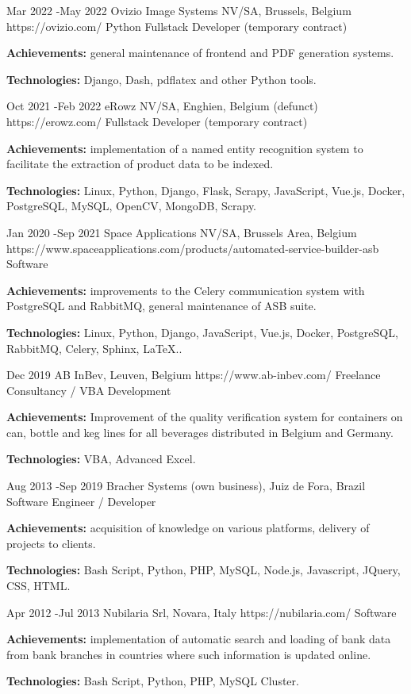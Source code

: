 \documentclass[10pt]{article} %
\begin{document}
\job
{Mar 2022 -}{May 2022}
{Ovizio Image Systems NV/SA, Brussels, Belgium}
{https://ovizio.com/}
{Python Fullstack Developer (temporary contract)}
{\rule{0mm}{2mm}\textbf{Achievements:} general maintenance of frontend and PDF generation systems.\\
\rule{0mm}{3mm}\textbf{Technologies:} Django, Dash, pdflatex and other Python tools.}

\job
{Oct 2021 -}{Feb 2022}
{eRowz  NV/SA, Enghien, Belgium (defunct)}
{https://erowz.com/}
{Fullstack Developer (temporary contract)}
{\rule{0mm}{2mm}\textbf{Achievements:} implementation of a named entity recognition system to facilitate the extraction of product data to be indexed.\\
\rule{0mm}{3mm}\textbf{Technologies:} Linux, Python, Django, Flask, Scrapy, JavaScript, Vue.js, Docker, PostgreSQL, MySQL, OpenCV, MongoDB, Scrapy.}

\job
{Jan 2020 -}{Sep 2021}
{Space Applications NV/SA, Brussels Area, Belgium}
{https://www.spaceapplications.com/products/automated-service-builder-asb}
{Software }
{\rule{0mm}{2mm}\textbf{Achievements:} improvements to the Celery communication system with PostgreSQL and RabbitMQ, general maintenance of ASB suite.\\
\rule{0mm}{3mm}\textbf{Technologies:} Linux, Python, Django, JavaScript, Vue.js, Docker, PostgreSQL, RabbitMQ, Celery, Sphinx, LaTeX..}

\job
{Dec 2019}{}
{AB InBev, Leuven, Belgium}
{https://www.ab-inbev.com/}
{Freelance Consultancy / VBA Development}
{\rule{0mm}{2mm}\textbf{Achievements:} Improvement of the quality verification system for containers on can, bottle and keg lines for all beverages distributed in Belgium and Germany.\\
\rule{0mm}{3mm}\textbf{Technologies:} VBA, Advanced Excel.}

\job
{Aug 2013 -}{Sep 2019}
{Bracher Systems (own business), Juiz de Fora, Brazil}
{}
{Software Engineer / Developer}
{\rule{0mm}{2mm}\textbf{Achievements:} acquisition of knowledge on various platforms, delivery of projects to clients.\\
\rule{0mm}{3mm}\textbf{Technologies:} Bash Script, Python, PHP, MySQL, Node.js, Javascript, JQuery, CSS, HTML.}

\job
{Apr 2012 -}{Jul 2013}
{Nubilaria Srl, Novara, Italy}
{https://nubilaria.com/}
{Software }
{\rule{0mm}{2mm}\textbf{Achievements:} implementation of automatic search and loading of bank data from bank branches in countries where such information is updated online.\\
\rule{0mm}{3mm}\textbf{Technologies:} Bash Script, Python, PHP, MySQL Cluster.}
\end{document}
